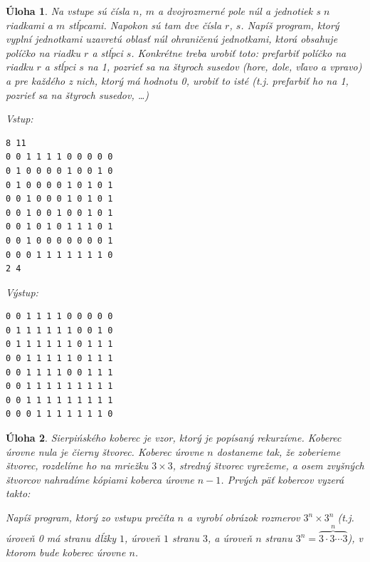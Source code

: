\documentclass[10pt]{article}
\def\ods{\vspace*{10pt}}
\newtheorem{uloha}{Úloha}
\def\bp{\begin{minipage}[t]{0.45\textwidth}\vspace{0pt}}
\def\ep{\end{minipage}}
\def\inp{{\rm Vstup:}\\[-4.2ex]}
\def\outp{{\rm Výstup:}\\[-4.2ex]}
\def\longSierp{1}
\def\longSierp{0}
\begin{document}
\begin{uloha}
  \label{uloha:fill}
  Na vstupe sú čísla $n$, $m$ a dvojrozmerné pole núl a jednotiek s $n$ riadkami
  a $m$ stĺpcami. Napokon sú tam dve čísla $r$, $s$.
  Napíš program, ktorý vyplní jednotkami uzavretú oblasť núl ohraničenú jednotkami,
  ktorá obsahuje políčko na riadku $r$ a stĺpci $s$.
  Konkrétne treba urobiť toto: prefarbiť políčko na riadku $r$ a stĺpci $s$ na 1,
  pozrieť sa na štyroch susedov (hore, dole, vľavo a vpravo) a pre každého z nich,
  ktorý má hodnotu 0, urobiť to isté (t.j. prefarbiť ho na 1, pozrieť sa na štyroch 
  susedov, \ldots)


  \ods
\bp
\inp
\begin{verbatim}
8 11
0 0 1 1 1 1 0 0 0 0 0
0 1 0 0 0 0 1 0 0 1 0
0 1 0 0 0 0 1 0 1 0 1
0 0 1 0 0 0 1 0 1 0 1
0 0 1 0 0 1 0 0 1 0 1
0 0 1 0 1 0 1 1 1 0 1 
0 0 1 0 0 0 0 0 0 0 1 
0 0 0 1 1 1 1 1 1 1 0 
2 4
\end{verbatim}
\ep
\hfill
\bp
\outp
\begin{verbatim}
0 0 1 1 1 1 0 0 0 0 0
0 1 1 1 1 1 1 0 0 1 0
0 1 1 1 1 1 1 0 1 1 1
0 0 1 1 1 1 1 0 1 1 1
0 0 1 1 1 1 0 0 1 1 1
0 0 1 1 1 1 1 1 1 1 1 
0 0 1 1 1 1 1 1 1 1 1 
0 0 0 1 1 1 1 1 1 1 0 
\end{verbatim}
\ep

\end{uloha}

\begin{uloha}
  \def\sierp#1{
    \def\tre{0.333333333}
    \if#10
    \filldraw(0,0) rectangle (1,1);
    \else
    \foreach \x in {0,...,2}
    \foreach \y in {0,...,2} {
      \pgfmathparse{\x==1 && \y==1?int(1):int(0)}
      \ifnum\pgfmathresult=0{
        \begin{scope}[shift={(\tre*\x,\tre*\y)}, scale=\tre]
          \pgfmathtruncatemacro{\n}{#1-1}
          \sierp{\n}
        \end{scope}
      }
      \fi
    }
    \fi 
  }

  Sierpińského koberec je vzor, ktorý je popísaný rekurzívne. Koberec úrovne nula
  je čierny štvorec. Koberec úrovne $n$ dostaneme tak, že zoberieme štvorec, rozdelíme
  ho na mriežku $3\times3$, stredný štvorec vyrežeme, a osem zvyšných štvorcov nahradíme
  kópiami koberca úrovne $n-1$. Prvých päť kobercov vyzerá takto:

  \ods

  \ods
  Napíš program, ktorý zo vstupu prečíta $n$ a vyrobí obrázok rozmerov
  $3^n\times3^n$ (t.j. úroveň 0 má stranu dĺžky $1$, úroveň $1$ stranu $3$,
  a úroveň $n$ stranu $3^n=\overbrace{3\cdot3\cdots3}^n$), v ktorom bude koberec úrovne $n$.
\end{uloha}
\end{document}

